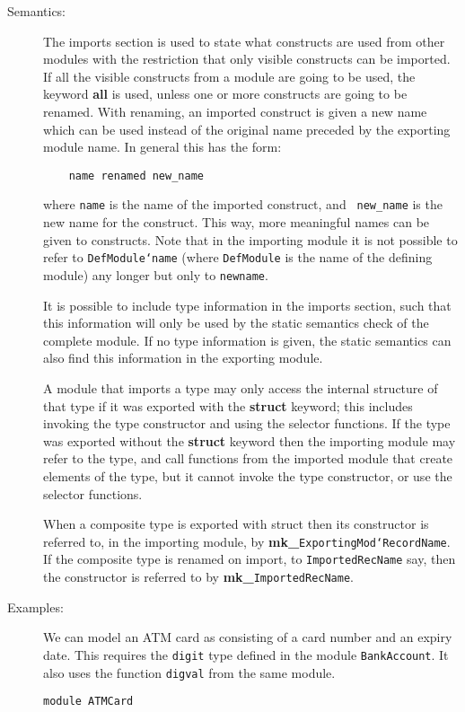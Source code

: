 \documentclass{overturerepchap}
\newcommand{\keyw}[1]{{\bf\ttfamily #1}}
\begin{document}
{\begin{description}
\item[Semantics:] The imports section is used to state what constructs are
  used from other modules with the restriction that only visible constructs
  can be imported. If all the visible constructs from a
  module are going to be used, the keyword \keyw{all} is used, unless one or
  more constructs are going to be renamed. With renaming, an imported
  construct is given a new name
  which can be used instead of the original name preceded by the
  exporting module name. In general this has the form:
  \begin{lstlisting}
    name renamed new_name
  \end{lstlisting}
  where {\tt name} is the name of the imported construct, and {\tt
    new\_name} is the new name for the construct. This way,
  more meaningful names can be given to constructs. Note that in the importing
  module it is not possible to refer to {\tt DefModule`name} (where
  {\tt DefModule} is the name of the defining module) any longer but only to
  {\tt newname}.

  It is possible to include type information in the imports section,
such that
  this information will only be used by the static semantics check of the
  complete module. If no type information is given, the static semantics
  can also find this information in the exporting module.

 A module that imports a type may only access the internal structure of that type if it was exported with the \keyw{struct} keyword; this includes invoking the type constructor and using the selector functions. If the type was exported without the \keyw{struct} keyword then the importing module may refer to the type, and call functions from the imported module that create elements of the type, but it cannot invoke the type constructor, or use the selector functions.

When a composite type is exported with struct then its constructor is referred to, in the importing module, by \keyw{mk\_}{\tt ExportingMod`RecordName}. If the composite type is renamed on import, to {\tt ImportedRecName} say, then the constructor is referred to by \keyw{mk\_}{\tt ImportedRecName}.

\item[Examples:] We can model an ATM card as consisting of a
card number and an expiry date. This requires the \texttt{digit} type
defined in the module \texttt{BankAccount}. It also uses the function
\texttt{digval} from the same module.
\begin{lstlisting}
module ATMCard


\end{lstlisting}
\end{description}}
\end{document}
